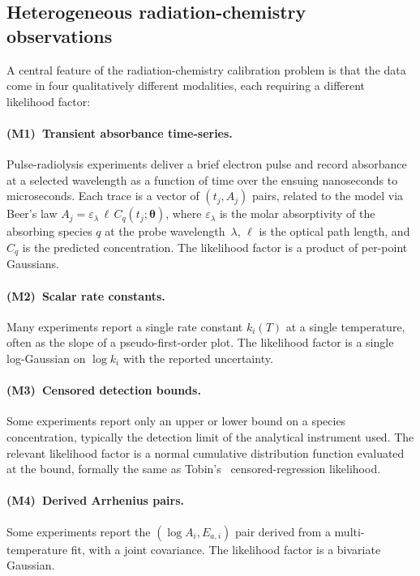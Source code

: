 \documentclass[12pt]{article}
\theoremstyle{plain}
\theoremstyle{definition}
\theoremstyle{remark}
\begin{document}
\subsection{Heterogeneous radiation-chemistry observations}\label{sec:bg:modalities}

A central feature of the radiation-chemistry calibration problem is that
the data come in four qualitatively different modalities, each requiring a
different likelihood factor:

\paragraph{(M1)~Transient absorbance time-series.}  Pulse-radiolysis
experiments deliver a brief electron pulse and record absorbance at a
selected wavelength as a function of time over the ensuing nanoseconds to
microseconds.  Each trace is a vector of $(t_j, A_j)$ pairs, related to the
model via Beer's law $A_j = \varepsilon_\lambda\,\ell\,C_q(t_j;
\boldsymbol{\theta})$, where $\varepsilon_\lambda$ is the molar absorptivity
of the absorbing species $q$ at the probe wavelength~$\lambda$, $\ell$ is
the optical path length, and $C_q$ is the predicted concentration.  The
likelihood factor is a product of per-point Gaussians.

\paragraph{(M2)~Scalar rate constants.}  Many experiments report a single
rate constant $k_i(T)$ at a single temperature, often as the slope of a
pseudo-first-order plot.  The likelihood factor is a single log-Gaussian on
$\log k_i$ with the reported uncertainty.

\paragraph{(M3)~Censored detection bounds.}  Some experiments report only an
upper or lower bound on a species concentration, typically the detection
limit of the analytical instrument used.  The relevant likelihood factor is
a normal cumulative distribution function evaluated at the bound, formally
the same as Tobin's~\citep{Tobin1958} censored-regression likelihood.

\paragraph{(M4)~Derived Arrhenius pairs.}  Some experiments report the
$(\log A_i, E_{a,i})$ pair derived from a multi-temperature fit, with a
joint covariance.  The likelihood factor is a bivariate Gaussian.
\end{document}
